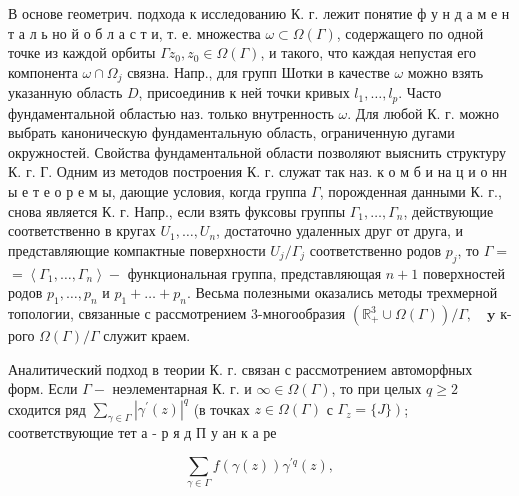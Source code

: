 \documentclass[10pt]{article}
\begin{document}
В основе геометрич. подхода к исследованию К. г. лежит понятие ф у н д а м е н т а л ь но й о б л а с т и, т. е. множества $\omega \subset \Omega(\Gamma)$, содержащего по одной точке из каждой орбиты $\Gamma z_{0}, z_{0} \in \Omega(\Gamma)$, и такого, что каждая непустая его компонента $\omega \cap \Omega_{j}$ связна. Напр., для групп Шотки в качестве $\omega$ можно взять указанную область $D$, присоединив к ней точки кривых $l_{1}, \ldots, l_{p}$. Часто фундаментальной областью наз. только внутренность $\omega$. Для любой К. г. можно выбрать каноническую фундаментальную область, ограниченную дугами окружностей. Свойства фундаментальной области позволяют выяснить структуру К. г. Г. Одним из методов построения К. г. служат так наз. к о м б и на ц и о нн ы е т е о р е м ы, дающие условия, когда группа $\Gamma$, порожденная данными К. г., снова является К. г. Напр., если взять фуксовы группы $\Gamma_{1}, \ldots, \Gamma_{n}$, действующие соответственно в кругах $U_{1}, \ldots, U_{n}$, достаточно удаленных друг от друга, и представляющие компактные поверхности $U_{j} / \Gamma_{j}$ соответственно родов $p_{j}$, то $\Gamma=$ $=\left\langle\Gamma_{1}, \ldots, \Gamma_{n}\right\rangle-$ функциональная группа, представляющая $n+1$ поверхностей родов $p_{1}, \ldots, p_{n}$ и $p_{1}+\ldots+p_{n}$. Весьма полезными оказались методы трехмерной топологии, связанные с рассмотрением 3-многообразия $\left(\mathbb{R}_{+}^{3} \cup \Omega(\Gamma)\right) / \Gamma, \quad \mathbf{y}$ к-рого $\Omega(\Gamma) / \Gamma$ служит краем.



Аналитический подход в теории К. г. связан с рассмотрением автоморфных форм. Если $\Gamma-$ неэлементарная К. г. и $\infty \in \Omega(\Gamma)$, то при целых $q \geqslant 2$ сходится ряд $\sum_{\gamma \in \Gamma}\left|\gamma^{\prime}(z)\right|^{q}$ (в точках $z \in \Omega(\Gamma)$ с $\left.\Gamma_{z}=\{J\}\right)$; соответствующие тет а - р я д П у ан к а ре



\[

\sum_{\gamma \in \Gamma} f(\gamma(z)) \gamma^{\prime q}(z),

\]
\end{document}
